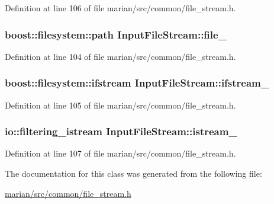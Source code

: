 Definition at line 106 of file marian/src/common/file\+\_\+stream.\+h.

\subsubsection[{\texorpdfstring{file\+\_\+}{file_}}]{\setlength{\rightskip}{0pt plus 5cm}boost\+::filesystem\+::path Input\+File\+Stream\+::file\+\_\+\hspace{0.3cm}{\ttfamily [private]}}\hypertarget{classInputFileStream_a2d500667ce04e9dfb7a23308d9ddf76d}{}\label{classInputFileStream_a2d500667ce04e9dfb7a23308d9ddf76d}


Definition at line 104 of file marian/src/common/file\+\_\+stream.\+h.

\subsubsection[{\texorpdfstring{ifstream\+\_\+}{ifstream_}}]{\setlength{\rightskip}{0pt plus 5cm}boost\+::filesystem\+::ifstream Input\+File\+Stream\+::ifstream\+\_\+\hspace{0.3cm}{\ttfamily [private]}}\hypertarget{classInputFileStream_a151c433c8d6f4f989438de27328a5ff2}{}\label{classInputFileStream_a151c433c8d6f4f989438de27328a5ff2}


Definition at line 105 of file marian/src/common/file\+\_\+stream.\+h.

\subsubsection[{\texorpdfstring{istream\+\_\+}{istream_}}]{\setlength{\rightskip}{0pt plus 5cm}io\+::filtering\+\_\+istream Input\+File\+Stream\+::istream\+\_\+\hspace{0.3cm}{\ttfamily [private]}}\hypertarget{classInputFileStream_a24a2f19b44c9f62116d4242ba8178396}{}\label{classInputFileStream_a24a2f19b44c9f62116d4242ba8178396}


Definition at line 107 of file marian/src/common/file\+\_\+stream.\+h.



The documentation for this class was generated from the following file\+:\begin{DoxyCompactItemize}
\item 
\hyperlink{marian_2src_2common_2file__stream_8h}{marian/src/common/file\+\_\+stream.\+h}\end{DoxyCompactItemize}
